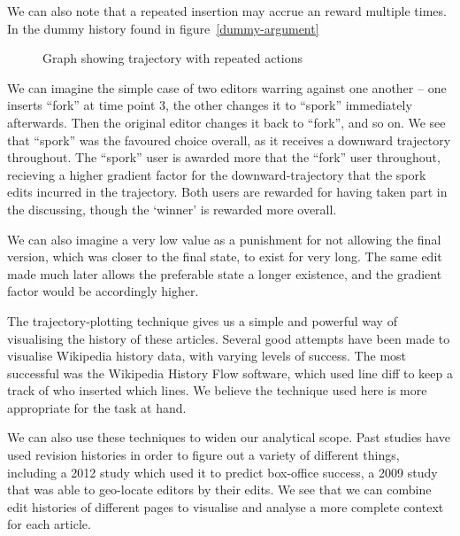 We can also note that a repeated insertion may accrue an reward
multiple times. In the dummy history found in figure~\ref{dummy-argument}

\begin{wrapfigure}{i}{0.4\textwidth}
  \centering
  \pgfplotsset{width=0.4\textwidth}
  \caption{Graph showing trajectory with repeated actions}
  \label{fig:dummy-argument}
\end{wrapfigure}

We can imagine the simple case of two editors warring against one
another -- one inserts ``fork'' at time point 3, the other changes it
to ``spork'' immediately afterwards. Then the original editor changes
it back to ``fork'', and so on. We see that ``spork'' was the favoured
choice overall, as it receives a downward trajectory throughout. The
``spork'' user is awarded more that the ``fork'' user throughout,
recieving a higher gradient factor for the downward-trajectory that
the spork edits incurred in the trajectory. Both users are rewarded
for having taken part in the discussing, though the `winner' is
rewarded more overall.

We can also imagine a very low value as a punishment for not allowing
the final version, which was closer to the final state, to exist for
very long. The same edit made much later allows the preferable state a
longer existence, and the gradient factor would be accordingly higher. 

The trajectory-plotting technique gives us a simple and powerful way
of visualising the history of these articles. Several good attempts
have been made to visualise Wikipedia history data, with varying
levels of
success.\cite{Chi2008}\cite{Sabel2007}\cite{Suh2007}\cite{Wu2013}\cite{Viegas2004}
The most successful was the Wikipedia History Flow
software,\cite{iphylo-history}\cite{wiki-history-flow} which used line
diff to keep a track of who inserted which lines. We believe the
technique used here is more appropriate for the task at hand.

We can also use these techniques to widen our analytical scope. Past
studies have used revision histories in order to figure out a variety
of different things, including a 2012 study which used it to predict
box-office success,\cite{Mestyan2012} a 2009 study that was able to
geo-locate editors by their edits.\cite{Lieberman2009} We see that we
can combine edit histories of different pages to visualise and analyse
a more complete context for each article.

